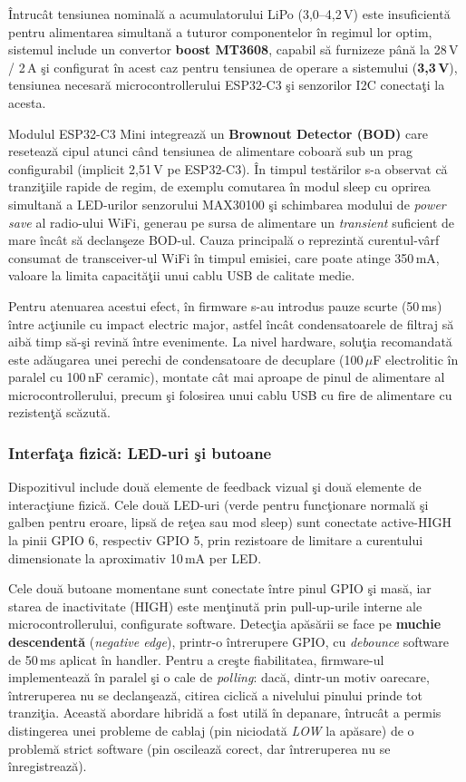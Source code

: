 \documentclass[12pt,a4paper,twoside]{article}
\begin{document}
Întrucât tensiunea nominală a acumulatorului LiPo (3{,}0--4{,}2\,V) este insuficientă pentru alimentarea simultană a tuturor componentelor în regimul lor optim, sistemul include un convertor \textbf{boost MT3608}, capabil să furnizeze până la 28\,V / 2\,A şi configurat în acest caz pentru tensiunea de operare a sistemului (\textbf{3{,}3\,V}), tensiunea necesară microcontrollerului ESP32-C3 şi senzorilor I2C conectaţi la acesta.

Modulul ESP32-C3 Mini integrează un \textbf{Brownout Detector (BOD)} care resetează cipul atunci când tensiunea de alimentare coboară sub un prag configurabil (implicit 2{,}51\,V pe ESP32-C3). În timpul testărilor s-a observat că tranziţiile rapide de regim, de exemplu comutarea în modul sleep cu oprirea simultană a LED-urilor senzorului MAX30100 şi schimbarea modului de \textit{power save} al radio-ului WiFi, generau pe sursa de alimentare un \textit{transient} suficient de mare încât să declanşeze BOD-ul. Cauza principală o reprezintă curentul-vârf consumat de transceiver-ul WiFi în timpul emisiei, care poate atinge 350\,mA, valoare la limita capacităţii unui cablu USB de calitate medie.

Pentru atenuarea acestui efect, în firmware s-au introdus pauze scurte (50\,ms) între acţiunile cu impact electric major, astfel încât condensatoarele de filtraj să aibă timp să-şi revină între evenimente. La nivel hardware, soluţia recomandată este adăugarea unei perechi de condensatoare de decuplare (100\,$\mu$F electrolitic în paralel cu 100\,nF ceramic), montate cât mai aproape de pinul de alimentare al microcontrollerului, precum şi folosirea unui cablu USB cu fire de alimentare cu rezistenţă scăzută.

\subsubsection{Interfaţa fizică: LED-uri şi butoane}

Dispozitivul include două elemente de feedback vizual şi două elemente de interacţiune fizică. Cele două LED-uri (verde pentru funcţionare normală şi galben pentru eroare, lipsă de reţea sau mod sleep) sunt conectate active-HIGH la pinii GPIO 6, respectiv GPIO 5, prin rezistoare de limitare a curentului dimensionate la aproximativ 10\,mA per LED.

Cele două butoane momentane sunt conectate între pinul GPIO şi masă, iar starea de inactivitate (HIGH) este menţinută prin pull-up-urile interne ale microcontrollerului, configurate software. Detecţia apăsării se face pe \textbf{muchie descendentă} (\textit{negative edge}), printr-o întrerupere GPIO, cu \textit{debounce} software de 50\,ms aplicat în handler. Pentru a creşte fiabilitatea, firmware-ul implementează în paralel şi o cale de \textit{polling}: dacă, dintr-un motiv oarecare, întreruperea nu se declanşează, citirea ciclică a nivelului pinului prinde tot tranziţia. Această abordare hibridă a fost utilă în depanare, întrucât a permis distingerea unei probleme de cablaj (pin niciodată \textit{LOW} la apăsare) de o problemă strict software (pin oscilează corect, dar întreruperea nu se înregistrează).
\end{document}
